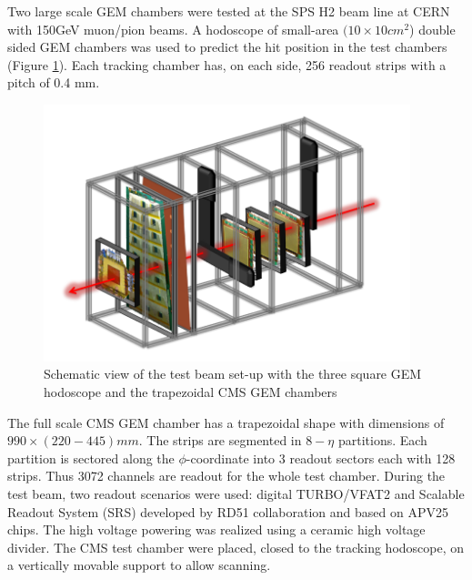 Two large scale GEM chambers were tested at the SPS H2 beam line at CERN with 150GeV muon/pion beams. A hodoscope of small-area $(10\times 10 cm^2$) double sided GEM chambers was used to predict the hit position in the test chambers (Figure \ref{fig:tbsetup}). Each tracking chamber has, on each side, 256 readout strips with a pitch of 0.4 mm.

\begin{figure}[!htbp]
	\begin{center}
		\includegraphics[width=0.95\textwidth]{figures/GEM/tbsetup.png}
		\caption{Schematic view of the test beam set-up with the three square GEM hodoscope and the trapezoidal CMS GEM chambers}
		\label{fig:tbsetup}
	\end{center}
\end{figure} 

The full scale CMS GEM chamber has a trapezoidal shape with dimensions of $990\times (220-445)mm$. The strips are segmented in $8-\eta$ partitions. Each partition is sectored along the $\phi$-coordinate into 3 readout sectors each with 128 strips. Thus 3072 channels are readout for the whole test chamber. During the test beam, two readout scenarios were used: digital TURBO/VFAT2 and Scalable Readout System (SRS) developed by RD51 collaboration and based on APV25 chips. The high voltage powering was realized using a ceramic high voltage divider. The CMS test chamber were placed, closed to the tracking hodoscope, on a vertically movable support to allow scanning. 


